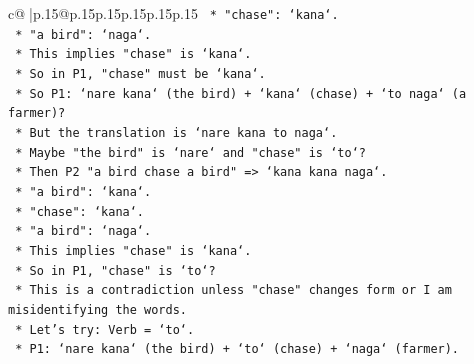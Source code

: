 \documentclass{article}
\begin{document}
{\begin{supertabular}{c@{$\;$}|p{.15\linewidth}@{}p{.15\linewidth}p{.15\linewidth}p{.15\linewidth}p{.15\linewidth}p{.15\linewidth}}
{{{\texttt{                                                                                *   "chase": `kana`.} \\
\texttt{                                                                                *   "a bird": `naga`.} \\
\texttt{                                                                                *   This implies "chase" is `kana`.} \\
\texttt{                                                                                *   So in P1, "chase" must be `kana`.} \\
\texttt{                                                                                *   So P1: `nare kana` (the bird) + `kana` (chase) + `to naga` (a farmer)?} \\
\texttt{                                                                                *   But the translation is `nare kana to naga`.} \\
\texttt{                                                                                *   Maybe "the bird" is `nare` and "chase" is `to`?} \\
\texttt{                                                                                *   Then P2 "a bird chase a bird" => `kana kana naga`.} \\
\texttt{                                                                                    *   "a bird": `kana`.} \\
\texttt{                                                                                    *   "chase": `kana`.} \\
\texttt{                                                                                    *   "a bird": `naga`.} \\
\texttt{                                                                                    *   This implies "chase" is `kana`.} \\
\texttt{                                                                                    *   So in P1, "chase" is `to`?} \\
\texttt{                                                                                    *   This is a contradiction unless "chase" changes form or I am misidentifying the words.} \\
\texttt{                                                                            *   Let's try: Verb = `to`.} \\
\texttt{                                                                                *   P1: `nare kana` (the bird) + `to` (chase) + `naga` (farmer).} \\
}}}
\end{supertabular}}
\end{document}
